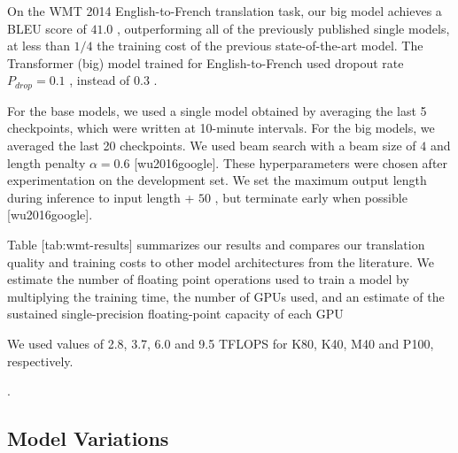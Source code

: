 \documentclass[11pt,a4paper]{article}
\begin{document}
On the WMT 2014 English-to-French translation task, our big model achieves a BLEU score of  $41.0$ , outperforming all of the previously published single models, at less than  $1/4$  the training cost of the previous state-of-the-art model. The Transformer (big) model trained for English-to-French used dropout rate  $P_{drop}=0.1$ , instead of  $0.3$ .

For the base models, we used a single model obtained by averaging the last 5 checkpoints, which were written at 10-minute intervals.  For the big models, we averaged the last 20 checkpoints. We used beam search with a beam size of  $4$  and length penalty  $\alpha=0.6$  [wu2016google].  These hyperparameters were chosen after experimentation on the development set.  We set the maximum output length during inference to input length +  $50$ , but terminate early when possible [wu2016google].

Table [tab:wmt-results] summarizes our results and compares our translation quality and training costs to other model architectures from the literature.  We estimate the number of floating point operations used to train a model by multiplying the training time, the number of GPUs used, and an estimate of the sustained single-precision floating-point capacity of each GPU

We used values of 2.8, 3.7, 6.0 and 9.5 TFLOPS for K80, K40, M40 and P100, respectively.

.

\subsection{Model Variations}
\end{document}
